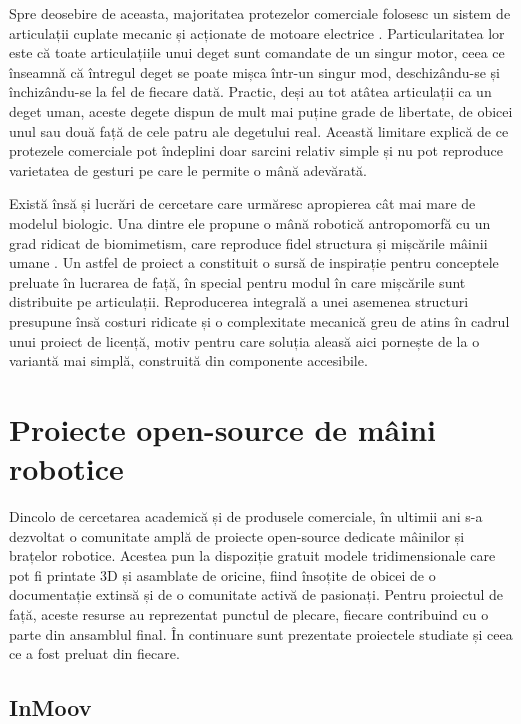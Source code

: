 Spre deosebire de aceasta, majoritatea protezelor comerciale folosesc un sistem de
articulații cuplate mecanic și acționate de motoare electrice \cite{hussein2014}.
Particularitatea lor este că toate articulațiile unui deget sunt comandate de un
singur motor, ceea ce înseamnă că întregul deget se poate mișca într-un singur mod,
deschizându-se și închizându-se la fel de fiecare dată. Practic, deși au tot atâtea
articulații ca un deget uman, aceste degete dispun de mult mai puține grade de
libertate, de obicei unul sau două față de cele patru ale degetului real. Această
limitare explică de ce protezele comerciale pot îndeplini doar sarcini relativ
simple și nu pot reproduce varietatea de gesturi pe care le permite o mână
adevărată.

Există însă și lucrări de cercetare care urmăresc apropierea cât mai mare de modelul
biologic. Una dintre ele propune o mână robotică antropomorfă cu un grad ridicat de
biomimetism, care reproduce fidel structura și mișcările mâinii umane
\cite{biomimetic2016}. Un astfel de proiect a constituit o sursă de inspirație
pentru conceptele preluate în lucrarea de față, în special pentru modul în care
mișcările sunt distribuite pe articulații. Reproducerea integrală a unei asemenea
structuri presupune însă costuri ridicate și o complexitate mecanică greu de atins
în cadrul unui proiect de licență, motiv pentru care soluția aleasă aici pornește
de la o variantă mai simplă, construită din componente accesibile.

\section{Proiecte open-source de mâini robotice}
\label{sec:biblio-opensource}

Dincolo de cercetarea academică și de produsele comerciale, în ultimii ani s-a
dezvoltat o comunitate amplă de proiecte open-source dedicate mâinilor și brațelor
robotice. Acestea pun la dispoziție gratuit modele tridimensionale care pot fi
printate 3D și asamblate de oricine, fiind însoțite de obicei de o documentație
extinsă și de o comunitate activă de pasionați. Pentru proiectul de față, aceste
resurse au reprezentat punctul de plecare, fiecare contribuind cu o parte din
ansamblul final. În continuare sunt prezentate proiectele studiate și ceea ce a
fost preluat din fiecare.

\subsection{InMoov}
\label{sec:biblio-inmoov}

